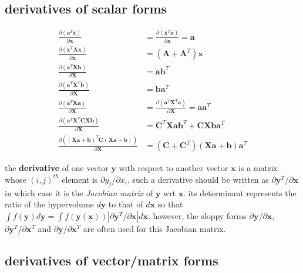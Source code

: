\documentclass[11pt]{article}
\renewcommand{\vec}[1]{\mathbf{#1}}
\newcommand{\mat}[1]{\mathbf{#1}}
\renewcommand{\t}{T}
\numberwithin{equation}{subsection}
\begin{document}
\subsection{derivatives of scalar forms}
\begin{align}
%
\frac{
	\partial \left( \vec{a}^\t \vec{x} \right)
}{
	\partial \vec{x}
} & = \frac{
	\partial \left( \vec{x}^\t \vec{a} \right)
}{
	\partial \vec{x}
} = \vec{a} \\
%
\frac{
	\partial \left(\vec{x}^\t \mat{A} \vec{x} \right)
}{
	\partial \vec{x}
} & = \left(\mat{A} + \mat{A}^\t\right) \vec{x} \\
%
\frac{
	\partial \left(\vec{a}^\t \mat{X} \vec{b}\right)
}{
	\partial \mat{X}
} & = \vec{a}\vec{b}^\t \\
%
\frac{
	\partial \left(\vec{a}^\t \mat{X}^\t \vec{b}\right)
}{
	\partial \mat{X}
} & = \vec{b}\vec{a}^\t \\
% 
\frac{
	\partial \left(\vec{a}^\t \mat{X} \vec{a}\right)
}{
	\partial \vec{X}
} & =
\frac{\partial \left(
		\vec{a}^\t \mat{X}^\t \vec{a}
	\right)
}{
	\partial \mat{X}
} =
\vec{a}\vec{a}^\t \\
%
\frac{
	\partial \left(\vec{a}^\t \mat{X}^\t \mat{C} \mat{X} \vec{b}\right)
}{
	\partial \mat{X}
} & = \mat{C}^\t \mat{X} \vec{a}\vec{b}^\t + 
	\mat{C} \mat{X} \vec{b}\vec{a}^\t \\
%
\frac{\partial \left(
		\left( 
			\mat{X} \vec{a} + \vec{b}
		\right)^\t 
		\mat{C}
		\left(
			\mat{X} \vec{a} + \vec{b}
		\right)
	\right)
	}{
	\partial \mat{X}
	} & = 
	\left(
		\mat{C} + \mat{C}^\t
	\right)
	\left(
		\mat{X}\vec{a} + \vec{b}
	\right)\vec{a}^\t
\end{align}


the \textbf{derivative} of one vector $\vec{y}$ with respect to another vector
$\vec{x}$ is a matrix whose $(i, j)^{th}$ element is $\partial y_j / 
\partial x_i$. such a derivative should be written as $\partial \vec{y}^\t / 
\partial \vec{x}$ in which case it is the \textit{Jacobian matrix} of 
$\vec{y}$ wrt $\vec{x}$. its determinant represents the ratio of the 
hypervolume $d\vec{y}$ to that of $d\vec{x}$ so that $\int f(\vec{y}) 
d\vec{y} = \int f(\vec{y}(\vec{x}))|\partial \vec{y}^\t / \partial \vec{x}|
d \vec{x}$. however, the sloppy forms $\partial \vec{y} / \partial \vec{x}$, 
$\partial \vec{y}^\t / \partial \vec{x}^\t$ and $\partial \vec{y} / 
\partial \vec{x}^\t$ are often used for this Jacobian matrix.

\subsection{derivatives of vector/matrix forms}
\end{document}
